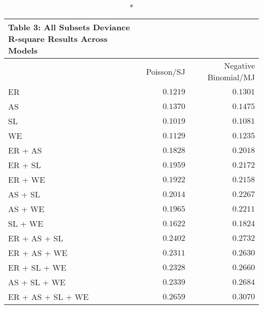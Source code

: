 \begin{longtable}{l|rr}
\caption*{
{\large Table 3: All Subsets Deviance R-square Results Across Models}
} \\ 
\toprule
\multicolumn{1}{l}{} & Poisson/SJ & Negative Binomial/MJ \\ 
\midrule
ER & $0.1219$ & $0.1301$ \\ 
AS & $0.1370$ & $0.1475$ \\ 
SL & $0.1019$ & $0.1081$ \\ 
WE & $0.1129$ & $0.1235$ \\ 
ER + AS & $0.1828$ & $0.2018$ \\ 
ER + SL & $0.1959$ & $0.2172$ \\ 
ER + WE & $0.1922$ & $0.2158$ \\ 
AS + SL & $0.2014$ & $0.2267$ \\ 
AS + WE & $0.1965$ & $0.2211$ \\ 
SL + WE & $0.1622$ & $0.1824$ \\ 
ER + AS + SL & $0.2402$ & $0.2732$ \\ 
ER + AS + WE & $0.2311$ & $0.2630$ \\ 
ER + SL + WE & $0.2328$ & $0.2660$ \\ 
AS + SL + WE & $0.2339$ & $0.2684$ \\ 
ER + AS + SL + WE & $0.2659$ & $0.3070$ \\ 
\bottomrule
\end{longtable}

